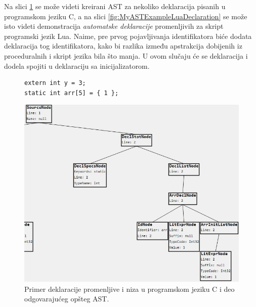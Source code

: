 Na slici \ref{fig:MyASTExampleCDeclaration} se može videti kreirani AST za nekoliko deklaracija pisanih u programskom jeziku C, a na slici \ref{fig:MyASTExampleLuaDeclaration} se može isto videti demonstracija \emph{automatske deklaracije} promenljivih za skript programski jezik Lua. Naime, pre prvog pojavljivanja identifikatora biće dodata deklaracija tog identifikatora, kako bi razlika između apstrakcija dobijenih iz proceduralnih i skript jezika bila što manja. U ovom slučaju će se deklaracija i dodela spojiti u deklaraciju sa inicijalizatorom.

\begin{figure}[h!]
\begin{lstlisting}
extern int y = 3;
static int arr[5] = { 1 };
\end{lstlisting}
\centering
\includegraphics[scale=0.7]{images/c_ast_decl2_cropped.png}
\caption{Primer deklaracije promenljive i niza u programskom jeziku C i deo odgovarajućeg opšteg AST.}
\label{fig:MyASTExampleCDeclaration}
\end{figure}

